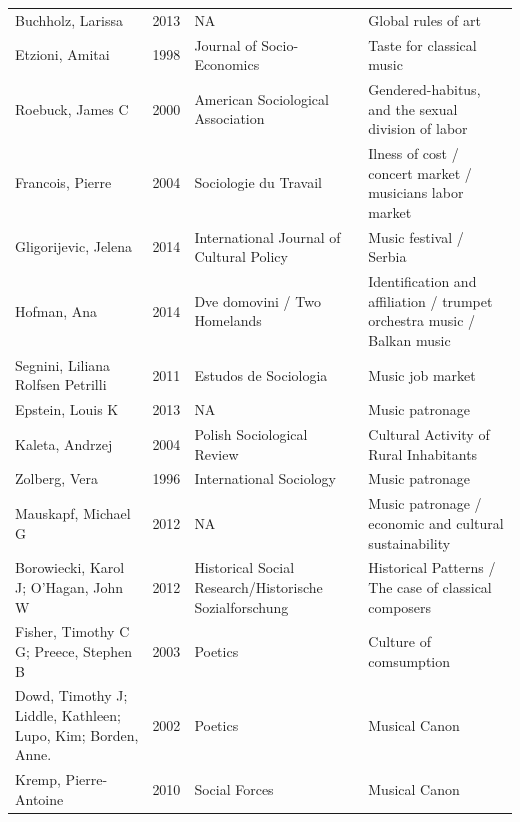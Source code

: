 \documentclass[a4paper, 12pt, openright, oneside, german, french, english, brazil]{abntex2}
\begin{document}
\begin{SingleSpace}
\begin{footnotesize}
\begin{center}
\begin{longtable}{p{4cm}lp{4cm}p{4cm}}
		Buchholz, Larissa & 2013 & NA & Global rules of art\\

		Etzioni, Amitai & 1998 & Journal of Socio-Economics & Taste for classical music\\

		Roebuck, James C & 2000 & American Sociological Association & Gendered-habitus, and the sexual division of labor\\

		Francois, Pierre & 2004 & Sociologie du Travail & Ilness of cost / concert market / musicians labor market\\

		Gligorijevic, Jelena & 2014 & International Journal of Cultural Policy & Music festival / Serbia\\

		Hofman, Ana & 2014 & Dve domovini / Two Homelands & Identification and affiliation / trumpet orchestra music / Balkan music\\

		Segnini, Liliana Rolfsen Petrilli & 2011 & Estudos de Sociologia & Music job market\\

		Epstein, Louis K & 2013 & NA & Music patronage\\

		Kaleta, Andrzej & 2004 & Polish Sociological Review & Cultural Activity of Rural Inhabitants\\

		Zolberg, Vera & 1996 & International Sociology & Music patronage\\

		Mauskapf, Michael G & 2012 & NA & Music patronage / economic and cultural sustainability\\

		Borowiecki, Karol J; O'Hagan, John W & 2012 & Historical Social Research/Historische Sozialforschung & Historical Patterns / The case of classical composers\\

		Fisher, Timothy C G; Preece, Stephen B & 2003 & Poetics & Culture of comsumption\\

		Dowd, Timothy J; Liddle, Kathleen; Lupo, Kim; Borden, Anne. & 2002 & Poetics & Musical Canon\\

		Kremp, Pierre-Antoine & 2010 & Social Forces & Musical Canon\\


\end{longtable}
\end{center}
\end{footnotesize}
\end{SingleSpace}
\end{document}
